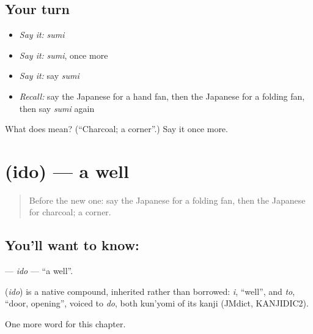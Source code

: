 \subsection*{Your turn}
\begin{itemize}
\raggedright
  \item \emph{Say it:} \emph{sumi}
  \item \emph{Say it:} \emph{sumi}, once more
  \item \emph{Say it:} say \emph{sumi}
  \item \emph{Recall:} say the Japanese for a hand fan, then the Japanese for a folding fan, then say \emph{sumi} again
\end{itemize}

\begin{tcolorbox}[breakable,colback=teal!4,colframe=teal!35!black,title={Before you move on}]
What does  mean? (\textquotedblleft{}Charcoal; a corner\textquotedblright{}.) Say it once more.
\end{tcolorbox}
\section[\texorpdfstring{\ja{いど} (ido)}{いど (ido)}]{ (ido) — a well}

\label{lesson:JA-C67-ido}



\begin{quote}
Before the new one: say the Japanese for a folding fan, then the Japanese for charcoal; a corner.
\end{quote}

\subsection*{You'll want to know: }
\textbf{} — \emph{ido} — \textquotedblleft{}a well\textquotedblright{}.

\begin{cousinweb}
\textbf{} (\emph{ido}) is a native compound, inherited rather than borrowed: \emph{i}, \textquotedblleft{}well\textquotedblright{}, and \emph{to}, \textquotedblleft{}door, opening\textquotedblright{}, voiced to \emph{do}, both kun'yomi of its kanji (JMdict, KANJIDIC2).
\end{cousinweb}

\begin{grammarlens}[title={What you've built}]
One more word for this chapter.
\end{grammarlens}

